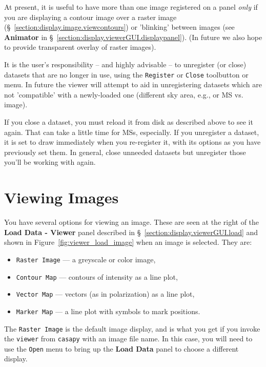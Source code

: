 At present, it is useful to have more than one image registered on a
panel {\em only} if you are displaying a contour image over a raster image
(\S~\ref{section:display.image.viewcontours}) or 'blinking' between images
(see {\bf Animator} in \S~\ref{section:display.viewerGUI.displaypanel}).
(In future we also hope to provide transparent overlay of raster images).

It is the user's responsibility -- and highly advisable -- to unregister
(or close) datasets that are no longer in use, using the {\tt Register}
or {\tt Close} toolbutton or menu.  In future the viewer will attempt
to aid in unregistering datasets which are not 'compatible' with a
newly-loaded one (different sky area, e.g., or MS vs. image).

If you close a dataset, you must reload it from disk as described above
to see it again.  That can take a little time for MSs, especially.  If you
unregister a dataset, it is set to draw immediately when you re-register it,
with its options as you have previously set them.  In general, close
unneeded datasets but unregister those you'll be working with again.

\section{Viewing Images}
\label{section:display.image}

You have several options for viewing an image.  These are seen
at the right of the {\bf Load Data - Viewer} panel 
described in \S~\ref{section:display.viewerGUI.load} and shown in 
Figure~\ref{fig:viewer_load_image} when an image is selected.  They are:
\begin{itemize}
   \item {\tt Raster Image} --- a greyscale or color image,
   \item {\tt Contour Map} --- contours of intensity as a line plot,
   \item {\tt Vector Map} --- vectors (as in polarization) as a line plot,
   \item {\tt Marker Map} --- a line plot with symbols to mark positions.
\end{itemize}

The {\tt Raster Image} is the default image display, and is what you
get if you invoke the {\tt viewer} from {\tt casapy} with an image
file name.  In this case, you will need to use the {\tt Open} menu to
bring up the {\bf Load Data} panel to choose a different display.

